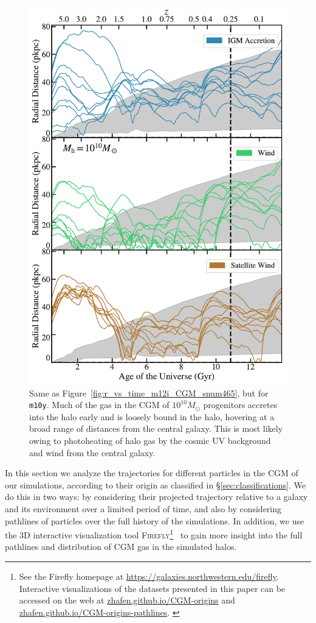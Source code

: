 \documentclass[fleqn,usenatbib]{mnras}
\begin{document}
\begin{figure}
\includegraphics[width=\columnwidth]{figures/r_vs_time_m10y_CGM_snum465_galdefv3.pdf}
\caption{
Same as Figure~\ref{fig:r_vs_time_m12i_CGM_snum465}, but for \texttt{m10y}.
Much of the gas in the CGM of $10^{10} M_\odot$ progenitors accretes into the halo early and is loosely bound in the halo, hovering at a broad range of distances from the central galaxy. 
This is most likely owing to photoheating of halo gas by the cosmic UV background and wind from the central galaxy.
}
\label{fig:r_vs_time_m10y_CGM_snum465}
\end{figure}

In this section we analyze the trajectories for different particles in the CGM of our simulations, according to their origin as classified in \S\ref{sec:classifications}. 
We do this in two ways:
by considering their projected trajectory relative to a galaxy and its environment over a limited period of time, and also by considering pathlines of particles over the full history of the simulations.
In addition, we use the 3D interactive visualization tool \textsc{Firefly}\footnote{See the Firefly homepage at \url{https://galaxies.northwestern.edu/firefly}.
Interactive visualizations of the datasets presented in this paper can be accessed on the web at \url{zhafen.github.io/CGM-origins} and \url{zhafen.github.io/CGM-origins-pathlines}.
\label{foot:firefly}
}~\citep{Geller2018} to gain more insight into the full pathlines and distribution of CGM gas in the simulated halos.
\end{document}
